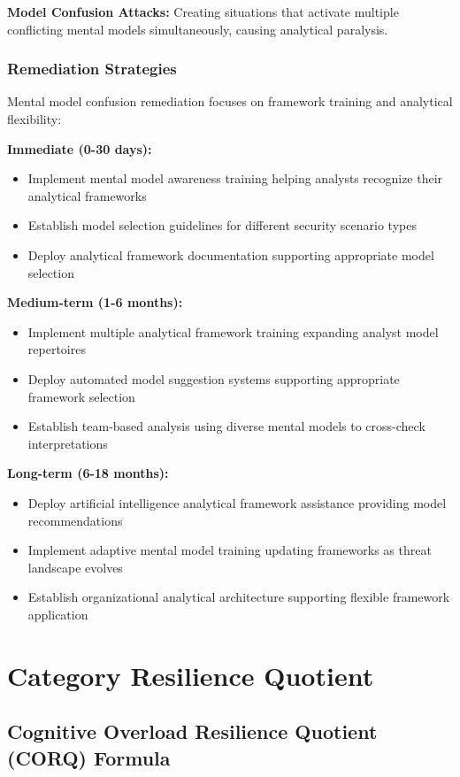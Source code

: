 \documentclass[11pt,a4paper]{article}
\begin{document}
\textbf{Model Confusion Attacks:} Creating situations that activate multiple conflicting mental models simultaneously, causing analytical paralysis.

\subsubsection{Remediation Strategies}

Mental model confusion remediation focuses on framework training and analytical flexibility:

\textbf{Immediate (0-30 days):}
\begin{itemize}
\item Implement mental model awareness training helping analysts recognize their analytical frameworks
\item Establish model selection guidelines for different security scenario types
\item Deploy analytical framework documentation supporting appropriate model selection
\end{itemize}

\textbf{Medium-term (1-6 months):}
\begin{itemize}
\item Implement multiple analytical framework training expanding analyst model repertoires
\item Deploy automated model suggestion systems supporting appropriate framework selection
\item Establish team-based analysis using diverse mental models to cross-check interpretations
\end{itemize}

\textbf{Long-term (6-18 months):}
\begin{itemize}
\item Deploy artificial intelligence analytical framework assistance providing model recommendations
\item Implement adaptive mental model training updating frameworks as threat landscape evolves
\item Establish organizational analytical architecture supporting flexible framework application
\end{itemize}

\section{Category Resilience Quotient}

\subsection{Cognitive Overload Resilience Quotient (CORQ) Formula}
\end{document}
